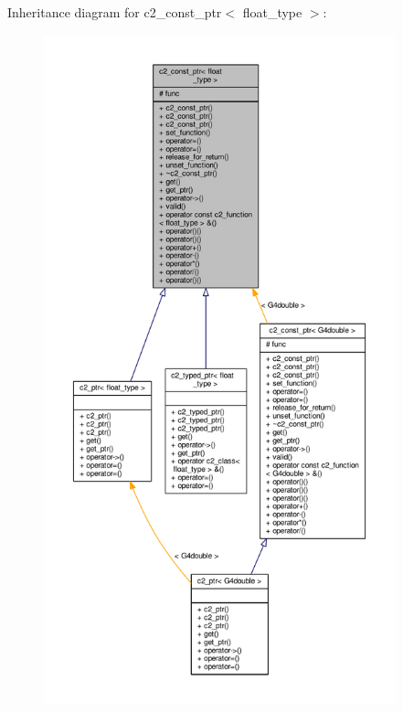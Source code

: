 Inheritance diagram for c2\+\_\+const\+\_\+ptr$<$ float\+\_\+type $>$\+:
\nopagebreak
\begin{figure}[H]
\begin{center}
\leavevmode
\includegraphics[height=550pt]{classc2__const__ptr__inherit__graph}
\end{center}
\end{figure}


